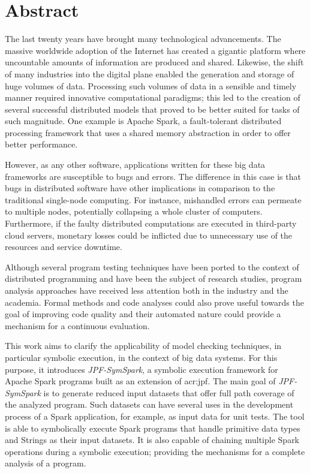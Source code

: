 \section*{Abstract}

The last twenty years have brought many technological advancements. The massive worldwide adoption of the Internet has created a gigantic platform where uncountable amounts of information are produced and shared. Likewise, the shift of many industries into the digital plane enabled the generation and storage of huge volumes of data. Processing such volumes of data in a sensible and timely manner required innovative computational paradigms; this led to the creation of several successful distributed models that proved to be better suited for tasks of such magnitude. One example is Apache Spark, a fault-tolerant distributed processing framework that uses a shared memory abstraction in order to offer better performance.

However, as any other software, applications written for these big data frameworks are susceptible to bugs and errors. The difference in this case is that bugs in distributed software have other implications in comparison to the traditional single-node computing. For instance, mishandled errors can permeate to multiple nodes, potentially collapsing a whole cluster of computers. Furthermore, if the faulty distributed computations are executed in third-party cloud servers, monetary losses could be inflicted due to unnecessary use of the resources and service downtime.

Although several program testing techniques have been ported to the context of distributed programming and have been the subject of research studies, program analysis approaches have received less attention both in the industry and the academia. Formal methods and code analyses could also prove useful towards the goal of improving code quality and their automated nature could provide a mechanism for a continuous evaluation.

This work aims to clarify the applicability of model checking techniques, in particular symbolic execution, in the context of big data systems. For this purpose, it introduces \textit{JPF-SymSpark}, a symbolic execution framework for Apache Spark programs built as an extension of \acrlong{acr:jpf}. The main goal of \textit{JPF-SymSpark} is to generate reduced input datasets that offer full path coverage of the analyzed program. Such datasets can have several uses in the development process of a Spark application, for example, as input data for unit tests. The tool is able to symbolically execute Spark programs that handle primitive data types and Strings as their input datasets. It is also capable of chaining multiple Spark operations during a symbolic execution; providing the mechanisms for a complete analysis of a program.

